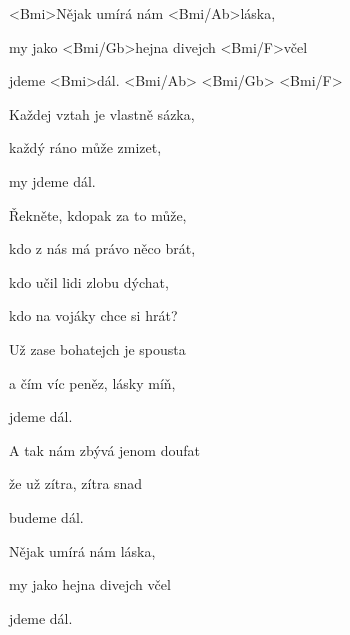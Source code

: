 

\zs
<Bmi>Nějak umírá nám <Bmi/Ab>láska,

my jako <Bmi/Gb>hejna divejch <Bmi/F>včel

jdeme <Bmi>dál. <Bmi/Ab> <Bmi/Gb> <Bmi/F>

Každej vztah je vlastně sázka,

každý ráno může zmizet,

my jdeme dál.
\ks

\zr
Řekněte, kdopak za to může,

kdo z nás má právo něco brát,

kdo učil lidi zlobu dýchat,

kdo na vojáky chce si hrát?
\kr

\zs
Už zase bohatejch je spousta

a čím víc peněz, lásky míň,

jdeme dál.

A tak nám zbývá jenom doufat

že už zítra, zítra snad

budeme dál.
\ks

\zr\kr

\zs
Nějak umírá nám láska,

my jako hejna divejch včel

jdeme dál.
\ks

\kp
